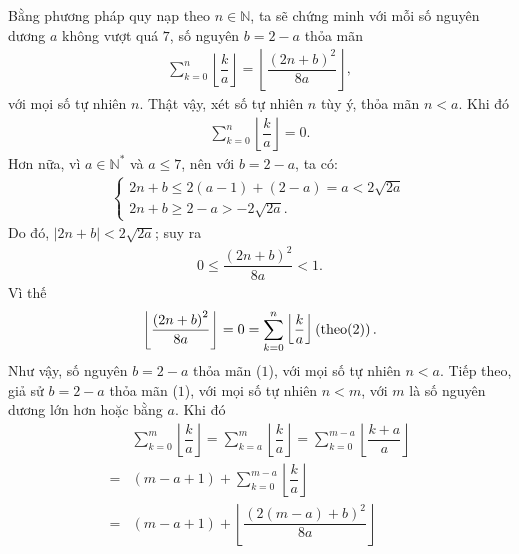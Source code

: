 \begin{multicols}{2}
	\vskip 0.05cm
	Bằng phương pháp quy nạp theo $n \in \mathbb{N}$, ta sẽ chứng minh với mỗi số nguyên dương $a$ không vượt quá $7$, số nguyên $b = 2 - a$ thỏa mãn
	\begin{align*}
		\sum\limits_{k = 0}^n {\left\lfloor {\dfrac{k}{a}} \right\rfloor}  = \left\lfloor {\dfrac{{{{\left( {2n + b} \right)}^2}}}{{8a}}} \right\rfloor, \tag{$1$}
	\end{align*}
	với mọi số tự nhiên $n$.
	\vskip 0.05cm
	Thật vậy, xét số tự nhiên $n$ tùy ý, thỏa mãn $n < a$.
	\vskip 0.05cm
	Khi đó
	\begin{align*}
		\sum\limits_{k = 0}^n {\left\lfloor {\dfrac{k}{a}} \right\rfloor}  = 0. \tag{$2$}
	\end{align*}
	Hơn nữa, vì $a \in \mathbb{N^*}$  và $a \le 7$, nên với \linebreak $b = 2 - a$, ta có:
	\begin{align*}
		\begin{cases}
			2n + b \le 2(a-1) + (2-a) = a < 2\sqrt{2a}\\
			2n + b \ge 2 - a > - 2\sqrt{2a}.
		\end{cases}
	\end{align*}
	Do đó, $|2n + b| < 2\sqrt {2a}$;  suy ra
	\begin{align*}
		0 \le \dfrac{{{{\left( {2n + b} \right)}^2}}}{{8a}} < 1.
	\end{align*}
	Vì thế
	\begin{align*}
		\left\lfloor {\dfrac{{{{\left( {2n + b} \right)}^2}}}{{8a}}} \right\rfloor = 0 = \sum\limits_{k = 0}^n {\left\lfloor {\dfrac{k}{a}} \right\rfloor} \left( {{\rm{theo}}(2)} \right).
	\end{align*}
	Như vậy, số nguyên $b = 2 - a$ thỏa mãn ($1$), với mọi số tự nhiên $n < a$.
	\vskip 0.05cm
	Tiếp theo, giả sử $b = 2 - a$ thỏa mãn ($1$), với mọi số tự nhiên $n < m$, với $m$ là số nguyên dương lớn hơn hoặc bằng $a$.
	\vskip 0.05cm
	\columnbreak
	Khi đó
	\begin{align*}
			&\sum\limits_{k = 0}^m {\left\lfloor {\dfrac{k}{a}} \right\rfloor}  = \sum\limits_{k = a}^m {\left\lfloor {\dfrac{k}{a}} \right\rfloor}  = \sum\limits_{k = 0}^{m - a} {\left\lfloor {\dfrac{{k + a}}{a}} \right\rfloor} \\
			 = &\left( {m - a + 1} \right) + \sum\limits_{k = 0}^{m - a} {\left\lfloor {\dfrac{k}{a}} \right\rfloor} \\
			= &\left( {m - a + 1} \right) + \left\lfloor {\dfrac{{{{\left( {2\left( {m - a} \right) + b} \right)}^2}}}{{8a}}} \right\rfloor \tag{$3$}\\

\end{align*}
\end{multicols}
